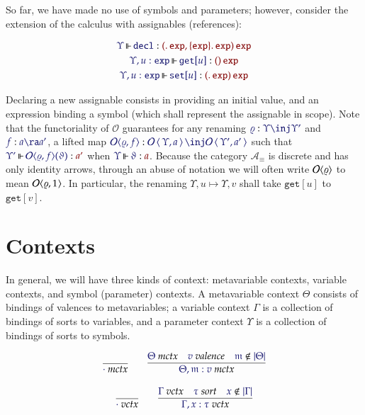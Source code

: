 \documentclass[11pt]{article}
\theoremstyle{definition}
\theoremstyle{remark}
\numberwithin{equation}{section}
\def\IModeColorName{MidnightBlue}
\def\OModeColorName{Maroon}
\newcommand\IMode[1]{{\color{\IModeColorName}{#1}}}
\newcommand\OMode[1]{{\color{\OModeColorName}{#1}}}
\newcommand\Of[2]{\IMode{#1}: \IMode{#2}}
\newcommand\MkValence[3]{%
  \ifthenelse{\equal{#1}{}}{}{%
    \{#1\}%
  }%
  \ifthenelse{\equal{#2}{}}{}{%
    [#2]%
  }.\, #3%
}
\newcommand\MkArity[2]{(#1)\, #2}
\newcommand\IsValence[1]{\IMode{#1}\ \textit{valence}}
\newcommand\IsSort[1]{\IMode{#1}\ \textit{sort}}
\newcommand\ArrId[1]{1_{#1}}
\newcommand\Arities{\mathcal{A}}
\newcommand\Operators{\mathcal{O}}
\newcommand\Discrete[1]{#1_{\equiv}}
\newcommand\IsOperator[3]{
  \IMode{#1}\,{\Vdash}\,\IMode{#2}: \OMode{#3}
}
\newcommand\IsMetaCtx[1]{\IMode{#1}\ \textit{mctx}}
\newcommand\IsVarCtx[1]{\IMode{#1}\ \textit{vctx}}
\newcommand\Pair[2]{\left\langle\,#1,#2\,\right\rangle}
\newcommand\FLift[2]{
  \Operators\langle#1%
  \ifthenelse{\equal{#2}{}}{}{, #2}\rangle%
}
\newcommand\MV[1]{\mathfrak{#1}}
\newcommand\Dom[1]{\left\vert#1\right\vert}
\newcommand\NotIn[2]{\IMode{#1}\notin\IMode{#2}}
\newcommand\SortExp{\mathtt{exp}}
\begin{document}
So far, we have made no use of symbols and parameters; however, consider the
extension of the calculus with assignables (references):

\begin{gather*}
  \IsOperator{\Upsilon}{\mathtt{decl}}{
    \MkArity{
      \MkValence{}{}{\SortExp},
      \MkValence{\SortExp}{}{\SortExp}
    }{
      \SortExp
    }
  }
\\
  \IsOperator{\Upsilon,u:\SortExp}{\mathtt{get}[u]}{
    \MkArity{}{\SortExp}
  }
\\
  \IsOperator{\Upsilon,u:\SortExp}{\mathtt{set}[u]}{
    \MkArity{
      \MkValence{}{}{\SortExp}
    }{
      \SortExp
    }
  }
\end{gather*}

Declaring a new assignable consists in providing an initial value, and an
expression binding a symbol (which shall represent the assignable in scope).
Note that the functoriality of $\Operators$ guarantees for any renaming
$\Of{\varrho}{\Upsilon\inj\Upsilon'}$ and $\Of{f}{a\ra a'}$, a lifted map
$\Of{\FLift{\varrho}{f}}{\Operators\Pair{\Upsilon}{a}\inj\Operators\Pair{\Upsilon'}{a'}}$
such that $\IsOperator{\Upsilon'}{\FLift{\varrho}{f}(\vartheta)}{a'}$ when
$\IsOperator{\Upsilon}{\vartheta}{a}$. Because the category
$\Discrete{\Arities}$ is discrete and has only identity arrows, through an abuse
of notation we will often write $\FLift{\varrho}{}$ to mean
$\FLift{\varrho}{\ArrId{}}$. In particular, the renaming
$\Upsilon,u\mapsto\Upsilon,v$ shall take $\mathtt{get}[u]$ to $\mathtt{get}[v]$.

\section{Contexts}

In general, we will have three kinds of context: metavariable contexts, variable
contexts, and symbol (parameter) contexts. A metavariable context $\Theta$
consists of bindings of valences to metavariables; a variable context $\Gamma$
is a collection of bindings of sorts to variables, and a parameter context
$\Upsilon$ is a collection of bindings of sorts to symbols.

\begin{gather*}
  \infer{
    \IsMetaCtx{\cdot}
  }{
  }
\qquad
  \infer{
    \IsMetaCtx{\Theta,\MV{m}:v}
  }{
    \IsMetaCtx{\Theta}
&
    \IsValence{v}
&
    \NotIn{\MV{m}}{\Dom\Theta}
  }
\end{gather*}

\begin{gather*}
  \infer{
    \IsVarCtx{\cdot}
  }{
  }
\qquad
  \infer{
    \IsVarCtx{\Gamma,x:\tau}
  }{
    \IsVarCtx{\Gamma}
&
    \IsSort{\tau}
&
    \NotIn{x}{\Dom\Gamma}
  }
\end{gather*}
\end{document}
